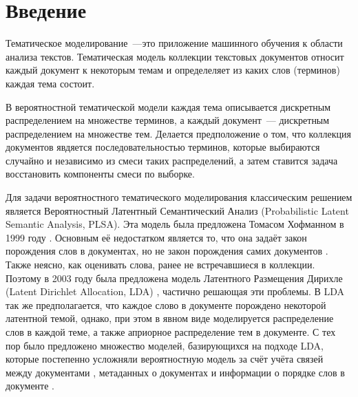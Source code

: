 \documentclass[12pt, twoside]{article}
\begin{document}

\maketitle
\linenumbers

\newcommand{\norm}{\mathop{\mathsf{norm}}\limits}

\section{Введение}
Тематическое моделирование~---это приложение машинного обучения к области анализа текстов. Тематическая модель коллекции текстовых документов относит каждый документ к некоторым темам и определеляет из каких слов (терминов) каждая тема состоит.

В вероятностной тематической модели каждая тема описывается дискретным распределением на множестве терминов,  а каждый документ~--- дискретным распределением на множестве тем. Делается предположение о том, что коллекция документов явдяется последовательностью терминов, которые выбираются случайно и независимо из смеси таких распределений, а затем ставится задача восстановить компоненты смеси по выборке.

Для  задачи вероятностного тематического моделирования  классическим решением является Вероятностный Латентный Семантический Анализ (Probabilistic Latent Semantic Analysis, PLSA). Эта модель  была предложена Томасом Хофманном в 1999 году \cite{hofmann1999probabilistic}. Основным её недостатком является то, что она задаёт закон порождения слов в документах, но не закон порождения самих документов \cite{daud2010knowledge}. Также  неясно, как оценивать слова, ранее не встречавшиеся в коллекции. Поэтому в 2003 году была предложена модель Латентного Размещения Дирихле (Latent Dirichlet Allocation, LDA) \cite{blei2003latent}, частично решающая эти проблемы. В LDA так же предполагается, что каждое слово в документе порождено некоторой латентной темой, однако, при этом в явном виде моделируется распределение слов в каждой теме, а также априорное
распределение тем в документе. С тех пор было предложено множество моделей, базирующихся на подходе LDA, которые постепенно усложняли вероятностную модель за счёт учёта связей между документами \cite{cohn2001missing,mccallum2005author,nallapati2008link}, метаданных о документах \cite{steyvers2004probabilistic} и информации о порядке слов в документе \cite{gruber2007hidden,wallach2006topic}.
\end{document}
